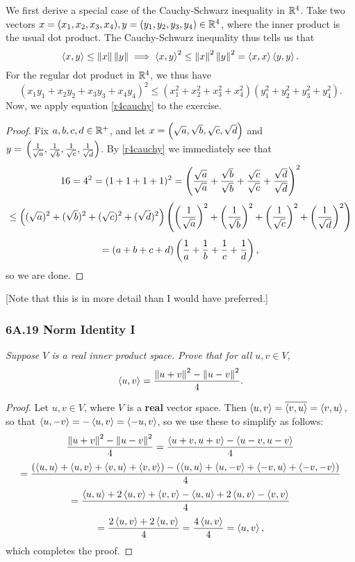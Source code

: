 \documentclass{article}
\begin{document}
We first derive a special case of the Cauchy-Schwarz inequality in $\mathbb R^4$. Take two vectors $x = (x_1, x_2, x_3, x_4), y=(y_1, y_2, y_3, y_4)\in \mathbb R^4$, where the inner product is the usual dot product. The Cauchy-Schwarz inequality thus tells us that
$$\left\langle x,y\right\rangle \leq \left\Vert x\right\Vert\left\Vert y\right\Vert \implies \left\langle x,y\right\rangle^2 \leq\left\Vert x\right\Vert^2\left\Vert y\right\Vert^2 = \left\langle x,x\right\rangle\left\langle y,y\right\rangle.$$
For the regular dot product in $\mathbb R^4$, we thus have
\begin{equation}\label{r4cauchy}
(x_1y_1+x_2y_2+x_3y_3+x_4y_4)^2 \leq (x_1^2+x_2^2+x_3^2 + x_4^2) (y_1^2+y_2^2+y_3^2+y_4^2).
\end{equation}
Now, we apply equation \eqref{r4cauchy} to the exercise.
\begin{proof}
Fix $a,b,c,d\in \mathbb R^+$, and let $x= \left(\sqrt a,\sqrt b,\sqrt c, \sqrt d \right)$ and $y =\\ \left(\frac 1{\sqrt a},\frac 1{\sqrt b},\frac 1{\sqrt c},\frac 1{\sqrt d} \right)$. By \eqref{r4cauchy} we immediately see that
$$16 = 4^2 = (1+1+1+1)^2 =  \left(\frac{\sqrt a}{\sqrt a}+\frac{\sqrt b}{\sqrt b}+\frac{\sqrt c}{\sqrt c}+\frac{\sqrt d}{\sqrt d} \right)^2$$
$$\leq \left((\sqrt a)^2 + (\sqrt b)^2 + (\sqrt c)^2 + (\sqrt d)^2 \right)\left(\left(\frac 1{\sqrt a} \right)^2 + \left(\frac 1{\sqrt b} \right)^2 + \left(\frac 1{\sqrt c} \right)^2 + \left(\frac 1{\sqrt d} \right)^2 \right)$$
$$=(a+b+c+d)\left(\frac 1a + \frac 1b + \frac 1c + \frac 1d \right),$$
so we are done.
\end{proof}
[Note that this is in more detail than I would have preferred.]

\newpage
\subsubsection*{6A.19 Norm Identity I}
\textit{Suppose $V$ is a real inner product space. Prove that for all $u,v\in V$,}
$$\left\langle u, v\right\rangle = \frac{\left\Vert u+v\right\Vert^2 - \left\Vert u-v\right\Vert^2}{4}.$$
\begin{proof}
Let $u, v \in V$, where $V$ is a \textbf{real} vector space. Then $\left\langle u, v\right\rangle = \overline{\left\langle v,u\right\rangle} = \left\langle v,u\right\rangle$, so that $\left\langle u, -v\right\rangle = -\left\langle u, v\right\rangle = \left\langle-u, v\right\rangle$, so we use these to simplify as follows:
$$\frac{\left\Vert u+v\right\Vert^2 -\left\Vert u-v\right\Vert^2}4 = \frac{\left\langle u+v, u+v\right\rangle - \left\langle u-v, u-v\right\rangle}{4}$$
$$=\frac{(\left\langle u,u\right\rangle + \left\langle u,v\right\rangle + \left\langle v,u\right\rangle + \left\langle v,v\right\rangle) - (\left\langle u, u\right\rangle + \left\langle u, -v\right\rangle + \left\langle-v, u\right\rangle + \left\langle-v, -v\right\rangle)}{4}$$
$$=\frac{\left\langle u,u\right\rangle + 2\left\langle u,v\right\rangle + \left\langle v,v\right\rangle - \left\langle u,u\right\rangle + 2\left\langle u, v\right\rangle - \left\langle v,v\right\rangle}4$$
$$=\frac{2\left\langle u,v\right\rangle + 2\left\langle u,v\right\rangle}4 = \frac{4\left\langle u, v\right\rangle}4 = \left\langle u,v\right\rangle,$$
which completes the proof.
\end{proof}
\end{document}
